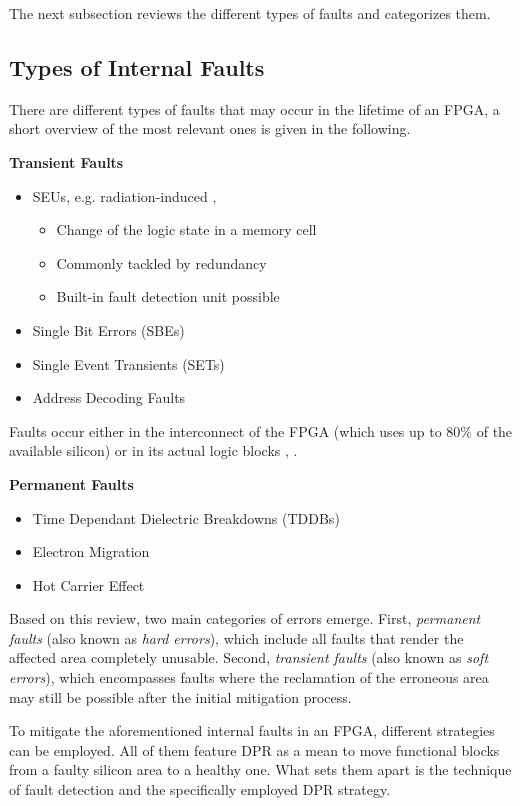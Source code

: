The next subsection reviews the different types of faults and categorizes them. 

\subsection{Types of Internal Faults}
There are different types of faults that may occur in the lifetime of an \gls{FPGA}, a short overview of the most relevant ones is given in the following.
\par
\textbf{Transient Faults}
\begin{itemize}
    \item \glspl{SEU}, e.g. radiation-induced \cite{alkady_fault-tolerant_2014}, \cite{lee_fault-tolerant_2017}
    \begin{itemize}
    \item Change of the logic state in a memory cell
    \item Commonly tackled by redundancy
    \item Built-in fault detection unit possible
    \end{itemize}
    \item Single Bit Errors (SBEs)
    \item Single Event Transients (SETs)
    \item Address Decoding Faults
\end{itemize}

Faults occur either in the interconnect of the \gls{FPGA} (which uses up to 80\% of the available silicon) or in its actual logic blocks \cite{alkady_fault-tolerant_2014}, \cite{jing_huang_routability_2004}.
\par
\textbf{Permanent Faults}
\begin{itemize}
    \item Time Dependant Dielectric Breakdowns (TDDBs)
    \item Electron Migration
    \item Hot Carrier Effect
\end{itemize}

Based on this review, two main categories of errors emerge.
First, \textit{permanent faults} (also known as \textit{hard errors}), which include all faults that render the affected area completely unusable. 
Second, \textit{transient faults} (also known as \textit{soft errors}), which encompasses faults where the reclamation of the erroneous area may still be possible after the initial mitigation process.

To mitigate the aforementioned internal faults in an \gls{FPGA}, different strategies can be employed.
All of them feature \gls{DPR} as a mean to move functional blocks from a faulty silicon area to a healthy one.
What sets them apart is the technique of fault detection and the specifically employed \gls{DPR} strategy.

